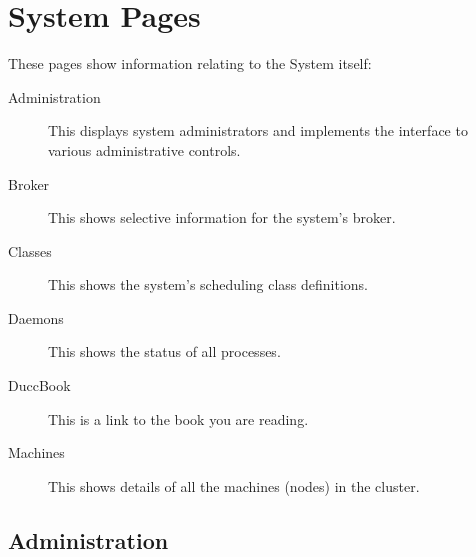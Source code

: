 % 
% 
% 
% 

\section{System Pages}
\label{sec:system-details}

These pages show information relating to the {\DUCC} System itself:
\begin{description}
  \item[Administration]This displays system administrators and implements
    the interface to various administrative controls.
  \item[Broker] This shows selective information for the system's broker.
  \item[Classes] This shows the system's scheduling class definitions.
  \item[Daemons] This shows the status of all {\DUCC} processes.
  \item[DuccBook] This is a link to the book you are reading.
  \item[Machines] This shows details of all the machines (nodes) in the {\DUCC} cluster.
\end{description}

\subsection{Administration}

